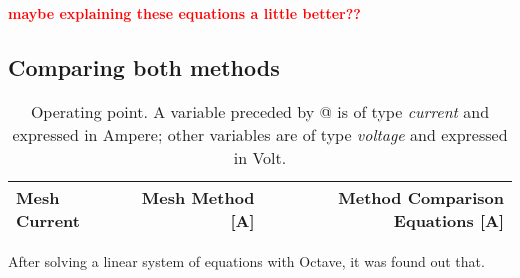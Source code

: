 \par
\textcolor{red}{\textbf{maybe explaining these equations a little better??}}


\subsection{Comparing both methods}
\par
\begin{table}[hbt!]
  \centering
  \begin{tabular}{|l|r|r|}
    \hline    
    {\bf Mesh Current} & {\bf Mesh Method [A]} & {\bf Method Comparison Equations [A]} \\ \hline
    
  \end{tabular}
  \caption{Operating point. A variable preceded by @ is of type {\em current}
    and expressed in Ampere; other variables are of type {\it voltage} and expressed in
    Volt.}
  \label{tab:op}
\end{table}
After solving a linear system of equations with Octave, it was found out that. 




